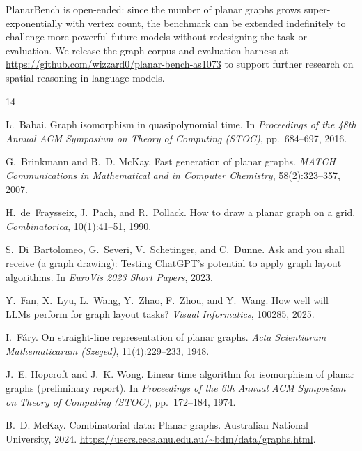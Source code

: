 \documentclass{article}
\begin{document}
PlanarBench is open-ended: since the number of planar graphs grows super-exponentially with vertex count, the benchmark can be extended indefinitely to challenge more powerful future models without redesigning the task or evaluation. We release the graph corpus and evaluation harness at \url{https://github.com/wizzard0/planar-bench-as1073} to support further research on spatial reasoning in language models.

\newpage


\begin{thebibliography}{14}

L.~Babai.
\newblock Graph isomorphism in quasipolynomial time.
\newblock In \emph{Proceedings of the 48th Annual ACM Symposium on Theory of Computing (STOC)}, pp.\ 684--697, 2016.

G.~Brinkmann and B.~D. McKay.
\newblock Fast generation of planar graphs.
\newblock \emph{MATCH Communications in Mathematical and in Computer Chemistry}, 58(2):323--357, 2007.

H.~de~Fraysseix, J.~Pach, and R.~Pollack.
\newblock How to draw a planar graph on a grid.
\newblock \emph{Combinatorica}, 10(1):41--51, 1990.

S.~Di~Bartolomeo, G.~Severi, V.~Schetinger, and C.~Dunne.
\newblock Ask and you shall receive (a graph drawing): Testing {ChatGPT}'s potential to apply graph layout algorithms.
\newblock In \emph{EuroVis 2023 Short Papers}, 2023.

Y.~Fan, X.~Lyu, L.~Wang, Y.~Zhao, F.~Zhou, and Y.~Wang.
\newblock How well will {LLM}s perform for graph layout tasks?
\newblock \emph{Visual Informatics}, 100285, 2025.

I.~F\'ary.
\newblock On straight-line representation of planar graphs.
\newblock \emph{Acta Scientiarum Mathematicarum (Szeged)}, 11(4):229--233, 1948.

J.~E. Hopcroft and J.~K. Wong.
\newblock Linear time algorithm for isomorphism of planar graphs (preliminary report).
\newblock In \emph{Proceedings of the 6th Annual ACM Symposium on Theory of Computing (STOC)}, pp.\ 172--184, 1974.

B.~D. McKay.
\newblock Combinatorial data: Planar graphs.
\newblock Australian National University, 2024.
\newblock \url{https://users.cecs.anu.edu.au/~bdm/data/graphs.html}.


\end{thebibliography}
\end{document}
